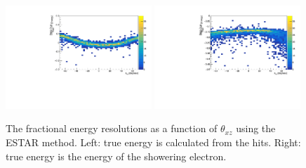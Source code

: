 \begin{figure}[h!]
    \centering
    \includegraphics[width = 0.49\textwidth]{figures-chap4/frac_res_vs_thetaXZ_cheating_electron_vertex_plane2_cut.pdf}
    \includegraphics[width = 0.49\textwidth]{figures-chap4/frac_res_vs_thetaXZ_showeringE_cheating_electron_vertex_plane2_cut.pdf}
    \caption[The fractional energy resolutions as a function of $\theta_{xz}$.]{The fractional energy resolutions as a function of $\theta_{xz}$ using the ESTAR method. Left: true energy is calculated from the hits. Right: true energy is the energy of the showering electron.}
    \label{fig:reconstruction_as_a_function_of_angle}
\end{figure}

